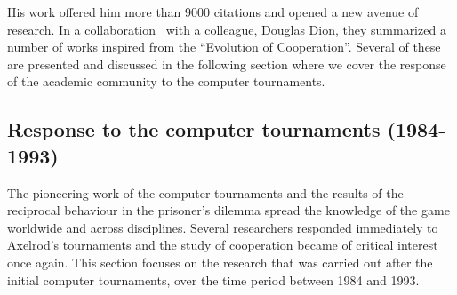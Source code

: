 \documentclass{article}
\theoremstyle{definition}
\begin{document}
His work offered him more than 9000 citations and opened a new avenue of research.
In a collaboration~\cite{Axelrod1988} with a colleague, Douglas Dion, they summarized
a number of works inspired from the ``Evolution of Cooperation''.
Several of these are presented and discussed in the following section where
we cover the response of the academic community to the computer tournaments.

\subsection{Response to the computer tournaments (1984-1993)}
\label{section:responses_to_computer_tournament}

The pioneering work of the computer tournaments and the results of the reciprocal behaviour
in the prisoner's dilemma spread the knowledge of the game worldwide and across
disciplines. Several researchers responded immediately to Axelrod's tournaments
and the study of cooperation became of critical interest once again.
This section focuses on the research that was carried out after the initial
computer tournaments, over the time period between 1984 and 1993.

\end{document}
